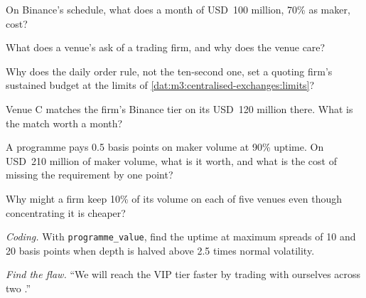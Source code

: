 \begin{exercise}[$\star$]\label{exo:m3:getting-access-crypto-venues:1}
On Binance's schedule, what does a month of USD~100 million, 70\% as maker, cost?
\end{exercise}

\begin{exercise}[$\star$]\label{exo:m3:getting-access-crypto-venues:2}
What does a venue's  ask of a trading firm, and why does the venue care?
\end{exercise}

\begin{exercise}[$\star$]\label{exo:m3:getting-access-crypto-venues:3}
Why does the daily order rule, not the ten-second one, set a quoting firm's sustained budget at the limits of
\cref{dat:m3:centralised-exchanges:limits}?
\end{exercise}

\begin{exercise}[$\star\star$]\label{exo:m3:getting-access-crypto-venues:4}
Venue C matches the firm's Binance tier on its USD~120 million there. What is the match worth a month?
\end{exercise}

\begin{exercise}[$\star\star$]\label{exo:m3:getting-access-crypto-venues:5}
A programme pays 0.5 basis points on maker volume at 90\% uptime. On USD~210 million of maker volume, what is it worth, and what is the cost of
missing the requirement by one point?
\end{exercise}

\begin{exercise}[$\star\star$]\label{exo:m3:getting-access-crypto-venues:6}
Why might a firm keep 10\% of its volume on each of five venues even though concentrating it is cheaper?
\end{exercise}

\begin{exercise}[$\star\star\star$]\label{exo:m3:getting-access-crypto-venues:7}
\emph{Coding.} With \texttt{programme\_value}, find the uptime at maximum spreads of 10 and 20 basis points when depth is halved above 2.5 times normal
volatility.
\end{exercise}

\begin{exercise}[$\star\star\star$]\label{exo:m3:getting-access-crypto-venues:8}
\emph{Find the flaw.} ``We will reach the VIP tier faster by trading with ourselves across two .''
\end{exercise}

